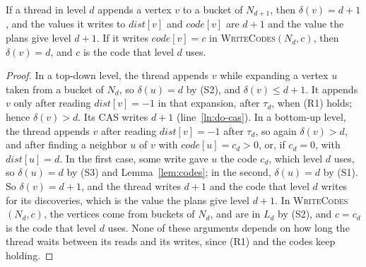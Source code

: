 \begin{lemma}[Discoveries]
\label{lem:discover}
If a thread in level $d$ appends a vertex $v$ to a bucket of $N_{d+1}$, then $\delta(v) = d+1$, and the values it writes to $\mathit{dist}[v]$ and $\mathit{code}[v]$ are $d+1$ and the value the plans give level $d+1$. If it writes $\mathit{code}[v] = c$ in \textsc{WriteCodes}$(N_d, c)$, then $\delta(v) = d$, and $c$ is the code that level $d$ uses.
\end{lemma}
\begin{proof}
In a top-down level, the thread appends $v$ while expanding a vertex $u$ taken from a bucket of $N_d$, so $\delta(u) = d$ by (S2), and $\delta(v) \leq d + 1$. It appends $v$ only after reading $\mathit{dist}[v] = -1$ in that expansion, after $\tau_d$, when (R1) holds; hence $\delta(v) > d$. Its CAS writes $d+1$ (line~\ref{ln:do-cas}). In a bottom-up level, the thread appends $v$ after reading $\mathit{dist}[v] = -1$ after $\tau_d$, so again $\delta(v) > d$, and after finding a neighbor $u$ of $v$ with $\mathit{code}[u] = c_d > 0$, or, if $c_d = 0$, with $\mathit{dist}[u] = d$. In the first case, some write gave $u$ the code $c_d$, which level $d$ uses, so $\delta(u) = d$ by (S3) and Lemma~\ref{lem:codes}; in the second, $\delta(u) = d$ by (S1). So $\delta(v) = d+1$, and the thread writes $d+1$ and the code that level $d$ writes for its discoveries, which is the value the plans give level $d+1$. In \textsc{WriteCodes}$(N_d, c)$, the vertices come from buckets of $N_d$, and are in $L_d$ by (S2), and $c = c_d$ is the code that level $d$ uses. None of these arguments depends on how long the thread waits between its reads and its writes, since (R1) and the codes keep holding.
\end{proof}

